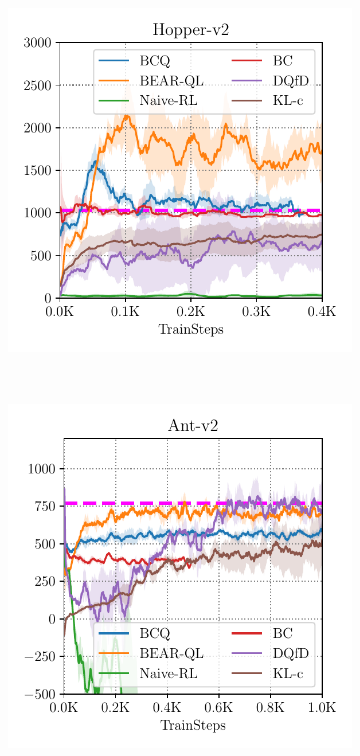 \begin{figure}[t!]
\begin{subfigure}[t]{0.23\textwidth}
    \end{subfigure}
    ~
    \begin{subfigure}[t]{0.23\textwidth}
        \centering
        \includegraphics[width=0.99\linewidth]{chapters/bear/images/images_camera_ready/hopper_mediocre_camera_ready.pdf}
    \end{subfigure}
    ~
    \begin{subfigure}[t]{0.23\textwidth}
        \centering
        \includegraphics[width=0.99\linewidth]{chapters/bear/images/images_camera_ready/ant_mediocre_camera_ready.pdf}

\end{subfigure}
\end{figure}
